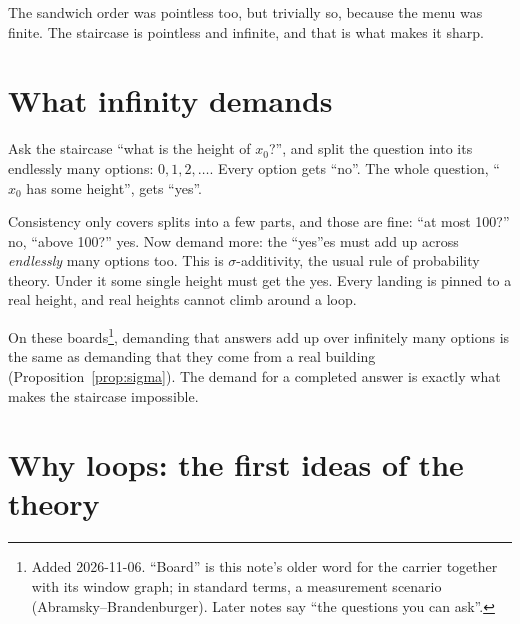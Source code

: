 \documentclass[11pt]{article}
\theoremstyle{plain}
\theoremstyle{definition}
\begin{document}
The sandwich order was pointless too, but trivially so, because the menu was
finite. The staircase is pointless and infinite, and that is what makes it sharp.

\section{What infinity demands}\label{sec:sigma}

Ask the staircase ``what is the height of $x_0$?'', and split the question into
its endlessly many options: $0,1,2,\dots$. Every option gets ``no''. The whole
question, ``$x_0$ has some height'', gets ``yes''.
\begin{center}
\end{center}
\noindent Consistency only covers splits into a few parts, and those are fine:
``at most 100?'' no, ``above 100?'' yes. Now demand more: the ``yes''es must add
up across \emph{endlessly} many options too. This is $\sigma$-additivity, the
usual rule of probability theory. Under it some single height must get the yes.
Every landing is pinned to a real height, and real heights cannot climb around a
loop.

On these boards\footnote{Added 2026-11-06. ``Board'' is this note's older word for the carrier together with its window graph; in standard terms, a measurement scenario (Abramsky--Brandenburger). Later notes say ``the questions you can ask''.}, demanding that answers add up over infinitely many options is
the same as demanding that they come from a real building
(Proposition~\ref{prop:sigma}). The demand for a completed answer is exactly
what makes the staircase impossible.


\section{Why loops: the first ideas of the theory}\label{sec:why}
\end{document}
